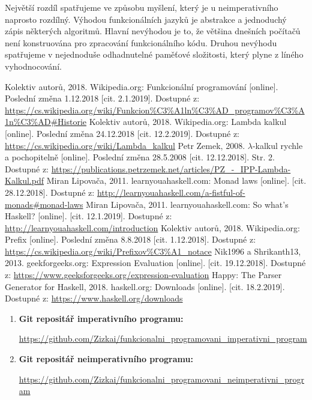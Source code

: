 \documentclass[12pt,a4paper]{report}
\begin{document}
Největší rozdíl spatřujeme ve způsobu myšlení, který je u neimperativního naprosto rozdílný. Výhodou funkcionálních jazyků je abstrakce a jednoduchý zápis některých algoritmů. Hlavní nevýhodou je to, že většina dnešních počítačů není konstruována pro zpracování funkcionálního kódu. Druhou nevýhodu spatřujeme v nejednoduše odhadnutelné paměťové složitosti, který plyne z líného vyhodnocování.   

\begin{thebibliography}{99}

Kolektiv autorů, 2018. Wikipedia.org: Funkcionální programování [online]. Poslední změna 1.12.2018 [cit. 2.1.2019]. Dostupné z: \url{https://cs.wikipedia.org/wiki/Funkcion%C3%A1ln%C3%AD_programov%C3%A1n%C3%AD#Historie}  
Kolektiv autorů, 2018. Wikipedia.org: Lambda kalkul [online]. Poslední změna 24.12.2018 [cit. 12.2.2019]. Dostupné z: \url{https://cs.wikipedia.org/wiki/Lambda_kalkul}
Petr Zemek, 2008. $\lambda$-kalkul rychle a pochopitelně [online]. Poslední změna 28.5.2008 [cit. 12.12.2018]. Str. 2. Dostupné z: \url{https://publications.petrzemek.net/articles/PZ_-_IPP-Lambda-Kalkul.pdf}
Miran Lipovača, 2011. learnyouahaskell.com: Monad laws [online]. [cit. 28.12.2018]. Dostupné z: \url{http://learnyouahaskell.com/a-fistful-of-monads#monad-laws}
Miran Lipovača, 2011. learnyouahaskell.com: So what's Haskell? [online]. [cit. 12.1.2019]. Dostupné z: \url{http://learnyouahaskell.com/introduction}
Kolektiv autorů, 2018. Wikipedia.org: Prefix [online]. Poslední změna 8.8.2018 [cit. 1.12.2018]. Dostupné z: \url{https://cs.wikipedia.org/wiki/Prefixov%C3%A1_notace}
Nik1996 a Shrikanth13, 2013. geekforgeeks.org: Expression Evaluation [online].  [cit. 19.12.2018]. Dostupné z: \url{https://www.geeksforgeeks.org/expression-evaluation}
Happy: The Parser Generator for Haskell, 2018. haskell.org: Downloads [online].  [cit. 18.2.2019]. Dostupné z: \url{https://www.haskell.org/downloads}
\end{thebibliography}


\begin{enumerate}
\item \textbf{Git repositář imperativního programu:} 

\url{https://github.com/Zizkai/funkcionalni_programovani_imperativni_program}

\item \textbf{Git repositář neimperativního programu:}

\url{https://github.com/Zizkai/funkcionalni_programovani_neimperativni_program}
\end{enumerate}

\openright
\end{document}
